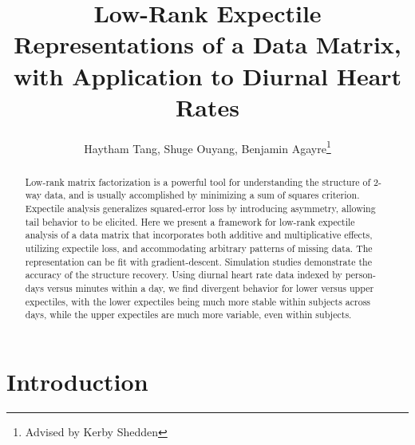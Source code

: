 \documentclass{article}
\title{Low-Rank Expectile Representations of a Data Matrix, with Application to Diurnal Heart Rates}
\author{Haytham Tang, Shuge Ouyang, Benjamin Agayre\thanks{Advised by Kerby Shedden}}
\date{}
\begin{document}
\maketitle

\begin{abstract}
    Low-rank matrix factorization is a powerful tool for understanding the structure of 2-way data, and is usually accomplished by minimizing a sum of squares criterion. Expectile analysis generalizes squared-error loss by introducing asymmetry, allowing tail behavior to be elicited. Here we present a framework for low-rank expectile analysis of a data matrix that incorporates both additive and multiplicative effects, utilizing expectile loss, and accommodating arbitrary patterns of missing data. The representation can be fit with gradient-descent. Simulation studies demonstrate the accuracy of the structure recovery. Using diurnal heart rate data indexed by person-days versus minutes within a day, we find divergent behavior for lower versus upper expectiles, with the lower expectiles being much more stable within subjects across days, while the upper expectiles are much more variable, even within subjects.
\end{abstract}

\section{Introduction}



\end{document}
